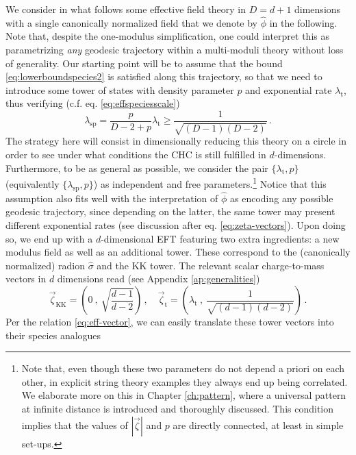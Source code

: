 We consider in what follows some effective field theory in $D=d+1$ dimensions with a single canonically normalized field that we denote by $\hat \phi$ in the following. Note that, despite the one-modulus simplification, one could interpret this as parametrizing \emph{any} geodesic trajectory within a multi-moduli theory without loss of generality. Our starting point will be to assume that the bound \eqref{eq:lowerboundspecies2} is satisfied along this trajectory, so that we need to introduce some tower of states with density parameter $p$ and exponential rate $\lambda_{\text{t}}$, thus verifying (c.f. eq. \eqref{eq:effspeciesscale})
%
\begin{equation}
    \lambda_{\text{sp}} = \frac{p}{D-2+p} \lambda_{\text{t}} \geq \frac{1}{\sqrt{(D-1)(D-2)}} \, .
\end{equation}
%
The strategy here will consist in dimensionally reducing this theory on a circle in order to see under what conditions the CHC is still fulfilled in $d$-dimensions. Furthermore, to be as general as possible, we consider the pair $\{\lambda_{\text{t}},p\}$ (equivalently $\{\lambda_{\text{sp}},p\}$) as independent and free parameters.\footnote{Note that, even though these two parameters do not depend a priori on each other, in explicit string theory examples they always end up being correlated. We elaborate more on this in Chapter \ref{ch:pattern}, where a universal pattern at infinite distance is introduced and thoroughly discussed. This condition implies that the values of $|\vec{\zeta}|$ and $p$ are directly connected, at least in simple set-ups.} Notice that this assumption also fits well with the interpretation of $\hat \phi$ as encoding any possible geodesic trajectory, since depending on the latter, the same tower may present different exponential rates (see discussion after eq. \eqref{eq:zeta-vectors}). Upon doing so, we end up with a $d$-dimensional EFT featuring two extra ingredients: a new modulus field as well as an additional tower. These correspond to the (canonically normalized) radion $\hat \sigma$ and the KK tower. The relevant scalar charge-to-mass vectors in $d$ dimensions read (see Appendix \ref{ap:generalities})
%
\begin{equation}\label{eq:zvectorafterdimreduction}
	\vec{\zeta}_{\text{KK}} = \left( 0 \ , \ \sqrt{\frac{d-1}{d-2}} \right) \, , \quad \vec{\zeta}_{\text{t}} = \left( \lambda_{\text{t}} \ ,\ \frac{1}{\sqrt{(d-1)(d-2)}} \right) \, .
\end{equation}
%
Per the relation \eqref{eq:eff-vector}, we can easily translate these tower vectors into their species analogues
